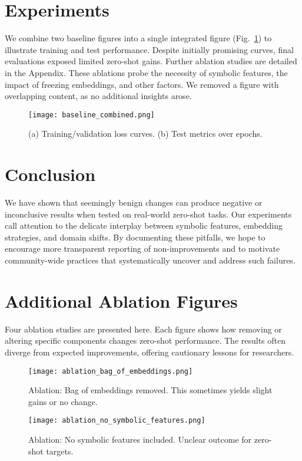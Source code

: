 \documentclass{article}
\begin{document}
\section{Experiments}
We combine two baseline figures into a single integrated figure (Fig.~\ref{fig:baseline}) to illustrate training and test performance. Despite initially promising curves, final evaluations exposed limited zero-shot gains. Further ablation studies are detailed in the Appendix. These ablations probe the necessity of symbolic features, the impact of freezing embeddings, and other factors. We removed a figure with overlapping content, as no additional insights arose.

\begin{figure}[ht]
\centering
\texttt{[image: baseline\_combined.png]}
\caption{(a) Training/validation loss curves. (b) Test metrics over epochs.}
\label{fig:baseline}
\end{figure}

\section{Conclusion}
We have shown that seemingly benign changes can produce negative or inconclusive results when tested on real-world zero-shot tasks. Our experiments call attention to the delicate interplay between symbolic features, embedding strategies, and domain shifts. By documenting these pitfalls, we hope to encourage more transparent reporting of non-improvements and to motivate community-wide practices that systematically uncover and address such failures.

\appendix
\section{Additional Ablation Figures}
Four ablation studies are presented here. Each figure shows how removing or altering specific components changes zero-shot performance. The results often diverge from expected improvements, offering cautionary lessons for researchers.

\begin{figure}[ht]
\centering
\texttt{[image: ablation\_bag\_of\_embeddings.png]}
\caption{Ablation: Bag of embeddings removed. This sometimes yields slight gains or no change.}
\end{figure}

\begin{figure}[ht]
\centering
\texttt{[image: ablation\_no\_symbolic\_features.png]}
\caption{Ablation: No symbolic features included. Unclear outcome for zero-shot targets.}
\end{figure}
\end{document}
